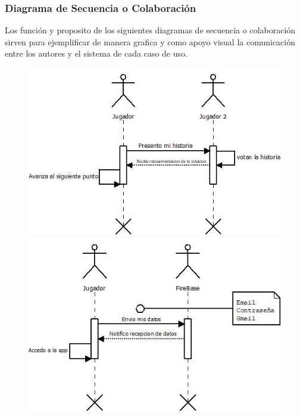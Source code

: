 \subsubsection{Diagrama de Secuencia o Colaboración}
Los función y proposito de los siguientes diagramas de secuencia o colaboración sirven para ejemplificar de manera grafica y como apoyo visual la comunicación entre los autores y el sistema de cada caso de uso.
\begin{figure}[H]
   \includegraphics[scale=0.6]{imgs/DS_1.jpeg}
   \includegraphics[scale=0.6]{imgs/DS_2.jpeg}
\end{figure}

